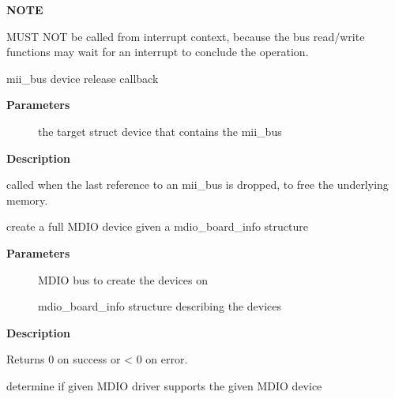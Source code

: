 \documentclass[a4paper,8pt,english]{sphinxmanual}
\begin{document}
\textbf{NOTE}

MUST NOT be called from interrupt context,
because the bus read/write functions may wait for an interrupt
to conclude the operation.

\begin{fulllineitems}
\label{networking/kapi:c.mdiobus_release}
mii\_bus device release callback

\end{fulllineitems}


\textbf{Parameters}
\begin{description}
\item[{}] \leavevmode
the target struct device that contains the mii\_bus

\end{description}

\textbf{Description}

called when the last reference to an mii\_bus is
dropped, to free the underlying memory.

\begin{fulllineitems}
\label{networking/kapi:c.mdiobus_create_device}
create a full MDIO device given a mdio\_board\_info structure

\end{fulllineitems}


\textbf{Parameters}
\begin{description}
\item[{}] \leavevmode
MDIO bus to create the devices on

\item[{}] \leavevmode
mdio\_board\_info structure describing the devices

\end{description}

\textbf{Description}

Returns 0 on success or \textless{} 0 on error.

\begin{fulllineitems}
\label{networking/kapi:c.mdio_bus_match}
determine if given MDIO driver supports the given MDIO device

\end{fulllineitems}
\end{document}
